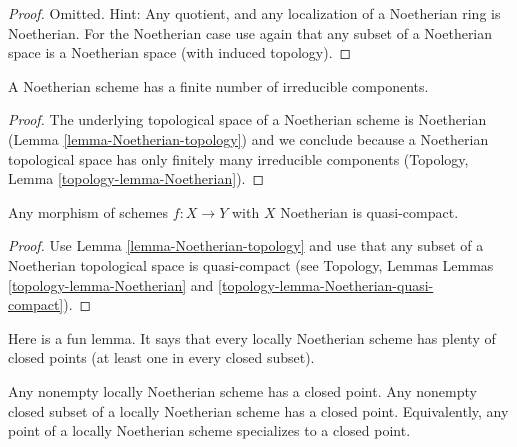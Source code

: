 \begin{proof}
Omitted. Hint: Any quotient, and any localization of a Noetherian
ring is Noetherian. For the Noetherian case use again
that any subset of a Noetherian space is a Noetherian space
(with induced topology).
\end{proof}

\begin{lemma}
\label{lemma-Noetherian-irreducible-components}
A Noetherian scheme has a finite number of irreducible components.
\end{lemma}

\begin{proof}
The underlying topological space of a Noetherian scheme is Noetherian
(Lemma \ref{lemma-Noetherian-topology})
and we conclude because a Noetherian topological space
has only finitely many irreducible components
(Topology, Lemma \ref{topology-lemma-Noetherian}).
\end{proof}

\begin{lemma}
\label{lemma-morphism-Noetherian-schemes-quasi-compact}
Any morphism of schemes $f : X \to Y$ with $X$ Noetherian
is quasi-compact.
\end{lemma}

\begin{proof}
Use Lemma \ref{lemma-Noetherian-topology}
and use that any subset of a Noetherian topological
space is quasi-compact (see Topology, Lemmas
Lemmas \ref{topology-lemma-Noetherian} and
\ref{topology-lemma-Noetherian-quasi-compact}).
\end{proof}

\noindent
Here is a fun lemma.
It says that every locally Noetherian scheme has plenty of
closed points (at least one in every closed subset).

\begin{lemma}
\label{lemma-locally-Noetherian-closed-point}
Any nonempty locally Noetherian scheme has a closed point.
Any nonempty closed subset of a locally Noetherian scheme has a closed point.
Equivalently, any point of a locally Noetherian scheme specializes
to a closed point.
\end{lemma}

